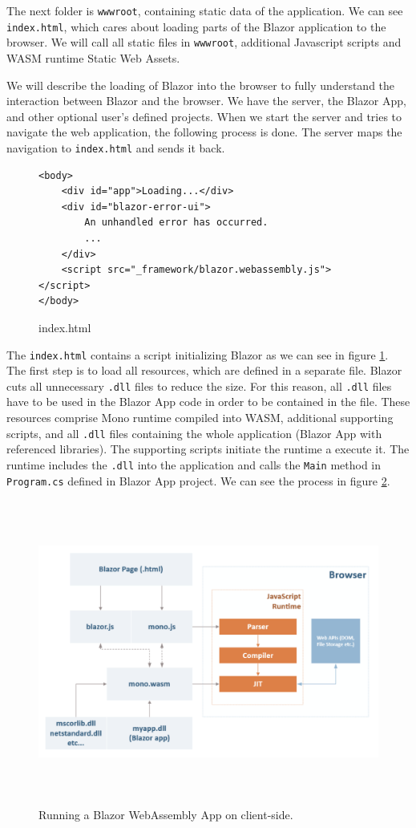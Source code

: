 The next folder is \texttt{wwwroot}, containing static data of the application.
We can see \texttt{index.html}, which cares about loading parts of the Blazor application to the browser.
We will call all static files in \texttt{wwwroot}, additional Javascript scripts and WASM runtime Static Web Assets.
\par
We will describe the loading of Blazor into the browser to fully understand the interaction between Blazor and the browser.
We have the server, the Blazor App, and other optional user's defined projects. 
When we start the server and tries to navigate the web application, the following process is done.
The server maps the navigation to \texttt{index.html} and sends it back.
\par
\begin{figure}
\begin{lstlisting}
<body>
    <div id="app">Loading...</div>
    <div id="blazor-error-ui">
        An unhandled error has occurred.
		...
    </div>
    <script src="_framework/blazor.webassembly.js"></script>
</body>

\end{lstlisting}
\caption{index.html}
\label{img07:index}
\end{figure}
\par 
The \texttt{index.html} contains a script initializing Blazor as we can see in figure \ref{img07:index}.
The first step is to load all resources, which are defined in a separate file.
Blazor cuts all unnecessary \texttt{.dll} files to reduce the size.
For this reason, all \texttt{.dll} files have to be used in the Blazor App code in order to be contained in the file. 
These resources comprise Mono runtime compiled into WASM, additional supporting scripts, and all \texttt{.dll} files containing the whole application (Blazor App with referenced libraries).
The supporting scripts initiate the runtime a execute it.
The runtime includes the \texttt{.dll} into the application and calls the \texttt{Main} method in \texttt{Program.cs} defined in Blazor App project.
We can see the process in figure \ref{img08:wasm}.
\par
\begin{figure}\centering
\includegraphics[width=140mm, height=100mm]{./img/BlazorExecution}
\caption{Running a Blazor WebAssembly App on client-side.}
\label{img08:wasm}
\end{figure}
